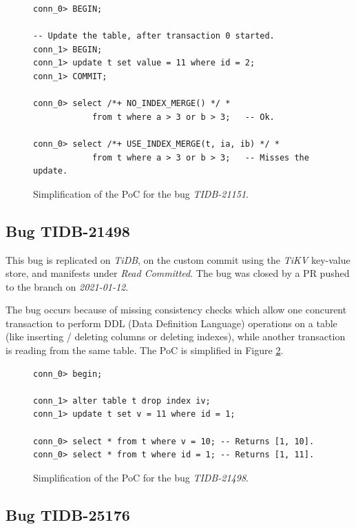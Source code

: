 \begin{figure}[H]
\begin{verbatim}
conn_0> BEGIN;

-- Update the table, after transaction 0 started.
conn_1> BEGIN;
conn_1> update t set value = 11 where id = 2;
conn_1> COMMIT;

conn_0> select /*+ NO_INDEX_MERGE() */ *
            from t where a > 3 or b > 3;   -- Ok.

conn_0> select /*+ USE_INDEX_MERGE(t, ia, ib) */ *
            from t where a > 3 or b > 3;   -- Misses the update.
\end{verbatim}
\caption{Simplification of the PoC for the bug \textit{TIDB-21151}.} \label{fig:TIDB-21151}
\end{figure}

\subsection*{Bug TIDB-21498}

This bug is replicated on \textit{TiDB}, on the custom commit  using the \textit{TiKV} key-value store, and manifests under \textit{Read Committed}. The bug was closed by a PR pushed to the  branch on \textit{2021-01-12}.

The bug occurs because of missing consistency checks which allow one concurent transaction to perform DDL (Data Definition Language) operations on a table (like inserting / deleting columns or deleting indexes), while another transaction is reading from the same table. The PoC is simplified in Figure \ref{fig:TIDB-21498}.

\begin{figure}[H]
\begin{verbatim}
conn_0> begin;

conn_1> alter table t drop index iv;
conn_1> update t set v = 11 where id = 1;

conn_0> select * from t where v = 10; -- Returns [1, 10].
conn_0> select * from t where id = 1; -- Returns [1, 11].
\end{verbatim}
\caption{Simplification of the PoC for the bug \textit{TIDB-21498}.} \label{fig:TIDB-21498}
\end{figure}

\subsection*{Bug TIDB-25176}

